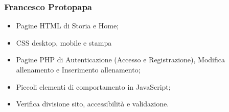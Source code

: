 \documentclass[a4paper]{article}
\begin{document}
	\subsubsection{Francesco Protopapa}
	\begin{itemize}
		\item Pagine HTML di Storia e Home;
		\item CSS desktop, mobile e stampa
		\item Pagine PHP di Autenticazione (Accesso e Registrazione), Modifica allenamento e Inserimento allenamento;
		\item Piccoli elementi di comportamento in JavaScript;
		\item Verifica divisione sito, accessibilità e validazione.       
	\end{itemize}
\end{document}
